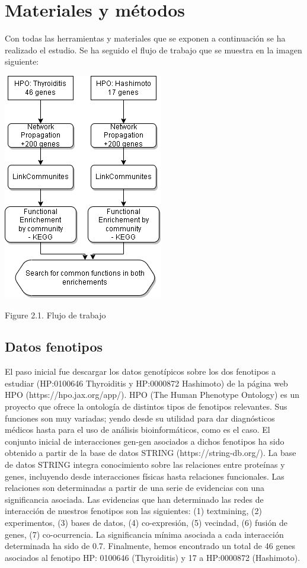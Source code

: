 \newpage
\section{Materiales y métodos}

Con todas las herramientas y materiales  que se exponen a continuación se ha realizado el  estudio. Se ha seguido el flujo de trabajo que se muestra en la imagen siguiente:

\begin{center}
 
    \includegraphics[scale=0.5]{figures/Diagrama sin tÃ­tulo.drawio.png}
    
    Figure 2.1. Flujo de trabajo
\end{center}


\subsection*{Datos fenotipos}
El paso inicial fue descargar los datos genotípicos sobre los dos fenotipos a estudiar (HP:0100646 Thyroiditis y HP:0000872 Hashimoto) de la página web HPO (https://hpo.jax.org/app/).  HPO (The Human Phenotype Ontology) es un proyecto que ofrece la ontología de distintos tipos de fenotipos relevantes. Sus funciones son muy variadas; yendo desde su utilidad para dar diagnósticos médicos hasta para el uso de análisis bioinformáticos, como es el caso.
El conjunto inicial de interacciones gen-gen asociados a dichos fenotipos ha sido  obtenido a partir de la base de datos STRING (https://string-db.org/). La base de datos STRING integra conocimiento sobre las relaciones entre proteínas y genes, incluyendo desde interacciones físicas hasta relaciones funcionales. Las relaciones son determinadas a partir de una serie de evidencias con una significancia asociada. \cite{Szklarczyk2021}  Las evidencias que han determinado las redes de interacción de nuestros fenotipos son las siguientes: (1) textmining, (2) experimentos, (3) bases de datos, (4) co-expresión, (5) vecindad, (6) fusión de genes, (7) co-ocurrencia. La significancia mínima asociada a cada interacción determinada ha sido de 0.7. Finalmente, hemos encontrado un total de 46 genes asociados al fenotipo  HP: 0100646 (Thyroiditis) y 17 a  HP:0000872 (Hashimoto). 

